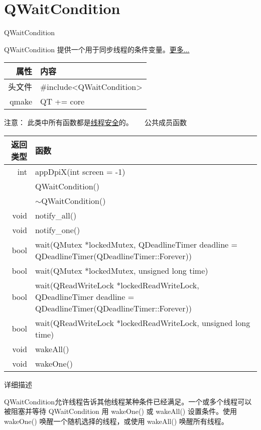 \chapter{QWaitCondition}

QWaitCondition

QWaitCondition 提供一个用于同步线程的条件变量。\href{https://github.com/QtDocumentCN/QtDocumentCN/blob/master/Src/W/QWaitCondition/QWaitCondition.md#%E8%AF%A6%E7%BB%86%E6%8F%8F%E8%BF%B0}{更多...} 
	
\begin{tabular}{|r|l|}
	\hline
	属性 & 内容 \\
	\hline
	头文件 & \#include<QWaitCondition>\\      
	\hline
	qmake & QT += core\\      
	\hline
\end{tabular}

注意： 此类中所有函数都是\href{https://github.com/QtDocumentCN/QtDocumentCN/blob/master/Src/R/Reentrancy_and_Thread-Safety/Reentrancy_and_Thread-Safety.md}{线程安全}的。
 	
公共成员函数

\begin{tabular}{|r|l|}
	\hline
	返回类型 & 函数 \\
	\hline
	int	& appDpiX(int screen = -1)\\
	\hline
	&QWaitCondition()\\
	\hline
	& $\sim$QWaitCondition()\\
	\hline
	void &	notify\_all()\\
	\hline
	void	&notify\_one()\\
		\hline
	bool&	wait(QMutex *lockedMutex, QDeadlineTimer deadline = QDeadlineTimer(QDeadlineTimer::Forever)) \\
	\hline
	bool &	wait(QMutex *lockedMutex, unsigned long time) \\
	\hline
	bool&	wait(QReadWriteLock *lockedReadWriteLock, QDeadlineTimer deadline = QDeadlineTimer(QDeadlineTimer::Forever)) \\
	\hline
	bool &	wait(QReadWriteLock *lockedReadWriteLock, unsigned long time) \\
	void &	wakeAll()\\
	\hline
	void &	wakeOne()\\
	\hline
\end{tabular}

详细描述

QWaitCondition允许线程告诉其他线程某种条件已经满足。一个或多个线程可以被阻塞并等待 QWaitCondition 用 wakeOne() 或 wakeAll() 设置条件。使用 wakeOne() 唤醒一个随机选择的线程，或使用 wakeAll() 唤醒所有线程。

